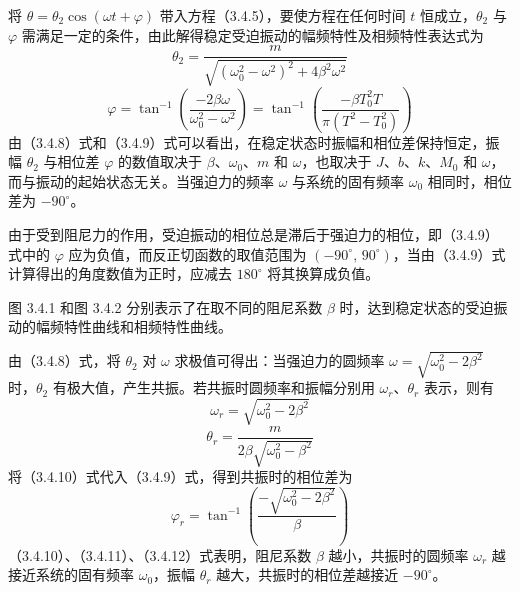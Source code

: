将 $\theta=\theta_2\cos(\omega t+\varphi)$ 带入方程（3.4.5），要使方程在任何时间 $t$ 恒成立，$\theta_2$ 与 $\varphi$ 需满足一定的条件，由此解得稳定受迫振动的幅频特性及相频特性表达式为
\begin{equation}
\theta_2=\frac{m}{\sqrt{(\omega_0^2-\omega^2)^2+4\beta^2\omega^2}}
\tag{3.4.8}
\end{equation}
\begin{equation}
\varphi=\tan^{-1}\!\left(\frac{-2\beta\omega}{\omega_0^2-\omega^2}\right)
=\tan^{-1}\!\left(\frac{-\beta T_0^2T}{\pi(T^2-T_0^2)}\right)
\tag{3.4.9}
\end{equation}
由（3.4.8）式和（3.4.9）式可以看出，在稳定状态时振幅和相位差保持恒定，振幅 $\theta_2$ 与相位差 $\varphi$ 的数值取决于 $\beta$、$\omega_0$、$m$ 和 $\omega$，也取决于 $J$、$b$、$k$、$M_0$ 和 $\omega$，而与振动的起始状态无关。当强迫力的频率 $\omega$ 与系统的固有频率 $\omega_0$ 相同时，相位差为 $-90^\circ$。

由于受到阻尼力的作用，受迫振动的相位总是滞后于强迫力的相位，即（3.4.9）式中的 $\varphi$ 应为负值，而反正切函数的取值范围为 $(-90^\circ,\,90^\circ)$，当由（3.4.9）式计算得出的角度数值为正时，应减去 $180^\circ$ 将其换算成负值。

图 3.4.1 和图 3.4.2 分别表示了在取不同的阻尼系数 $\beta$ 时，达到稳定状态的受迫振动的幅频特性曲线和相频特性曲线。

由（3.4.8）式，将 $\theta_2$ 对 $\omega$ 求极值可得出：当强迫力的圆频率 $\omega=\sqrt{\omega_0^2-2\beta^2}$ 时，$\theta_2$ 有极大值，产生共振。若共振时圆频率和振幅分别用 $\omega_r$、$\theta_r$ 表示，则有
\begin{equation}
\omega_r=\sqrt{\omega_0^2-2\beta^2}
\tag{3.4.10}
\end{equation}
\begin{equation}
\theta_r=\frac{m}{2\beta\sqrt{\omega_0^2-\beta^2}}
\tag{3.4.11}
\end{equation}
将（3.4.10）式代入（3.4.9）式，得到共振时的相位差为
\begin{equation}
\varphi_r=\tan^{-1}\!\left(\frac{-\sqrt{\omega_0^2-2\beta^2}}{\beta}\right)
\tag{3.4.12}
\end{equation}
（3.4.10）、（3.4.11）、（3.4.12）式表明，阻尼系数 $\beta$ 越小，共振时的圆频率 $\omega_r$ 越接近系统的固有频率 $\omega_0$，振幅 $\theta_r$ 越大，共振时的相位差越接近 $-90^\circ$。

